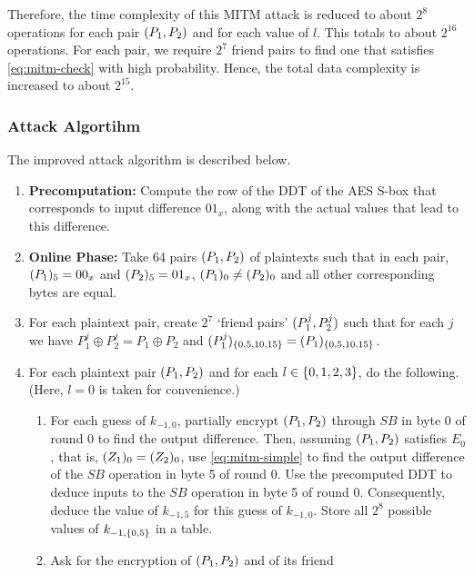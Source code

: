 \documentclass[twoside]{article}
\begin{document}
Therefore, the time complexity of this MITM attack is reduced to about \(2^8\)
operations for each pair \((P_1, P_2)\) and for each value of \(l\). This
totals to about \(2^{16}\) operations. For each pair, we require \(2^7\) friend
pairs to find one that satisfies \eqref{eq:mitm-check} with high probability.
Hence, the total data complexity is increased to about \(2^{15}\).

\subsubsection{Attack Algortihm}

The improved attack algorithm is described below.

\begin{enumerate}
    \item \textbf{Precomputation:} Compute the row of the DDT of the AES S-box
    that corresponds to input difference \(01_x\), along with the actual values
    that lead to this difference.
    \item \textbf{Online Phase:} Take 64 pairs \((P_1, P_2)\) of plaintexts
    such that in each pair, \((P_1)_5 = 00_x\) and \((P_2)_5 = 01_x\),
    \((P_1)_0 \ne (P_2)_0\) and all other corresponding bytes are
    equal.
    \item For each plaintext pair, create \(2^7\) `friend pairs' \((P_1^j,
    P_2^j)\) such that for each \(j\) we have \(P_1^j \oplus P_2^j = P_1 \oplus
    P_2\) and \((P_1^j)_{\{0, 5, 10, 15\}} = (P_1)_{\{0, 5,
    10, 15\}}\).
    \item For each plaintext pair \((P_1, P_2)\) and for each \(l \in
    \{0, 1, 2, 3\}\), do the following. (Here, \(l = 0\) is taken for
    convenience.)
    \begin{enumerate}
        \item For each guess of \(k_{-1, 0}\), partially encrypt \((P_1,
        P_2)\) through \(SB\) in byte 0 of round 0 to find the output
        difference. Then, assuming \((P_1, P_2)\) satisfies \(E_0\), that
        is, \((Z_1)_0 = (Z_2)_0\), use \eqref{eq:mitm-simple} to find
        the output difference of the \(SB\) operation in byte 5 of round 0. Use
        the precomputed DDT to deduce inputs to the \(SB\) operation in byte 5
        of round 0. Consequently, deduce the value of \(k_{-1, 5}\) for this
        guess of \(k_{-1, 0}\). Store all \(2^8\) possible values of \(k_{-1,
        \{0, 5\}}\) in a table.
        \item Ask for the encryption of \((P_1, P_2)\) and of its friend

\end{enumerate}
\end{enumerate}
\end{document}
